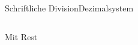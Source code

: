 \documentclass[xelatex,aspectratio=169]{beamer}
\begin{document}
\begin{frame}[t]{Schriftliche Division}{Dezimalsystem}
\begin{columns}
\begin{column}{0.5\textwidth}
{\begin{block}{Mit Rest}
        \end{block}
      }
    \end{column}
    \begin{column}{0.5\textwidth}
    \end{column}
  \end{columns}
\end{frame}
\end{document}
